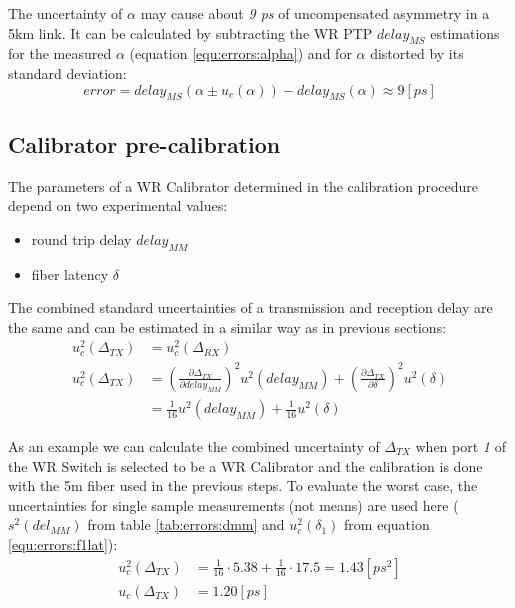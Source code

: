 The uncertainty of $\alpha$ may cause about \emph{9 ps} of uncompensated
asymmetry in a 5km link. It can be calculated by subtracting the WR PTP
$delay_{MS}$ estimations for the measured $\alpha$ (equation
\ref{equ:errors:alpha}) and for $\alpha$ distorted by its standard deviation:
\begin{equation}
	error = delay_{MS}(\alpha \pm u_c(\alpha)) - delay_{MS}(\alpha) \approx 9 [ps]
\end{equation}

\subsection{Calibrator pre-calibration}
The parameters of a WR Calibrator determined in the calibration procedure depend
on two experimental values:
\begin{itemize}
	\item round trip delay $delay_{MM}$
	\item fiber latency $\delta$
\end{itemize}

The combined standard uncertainties of a transmission and reception delay are the
same and can be estimated in a similar way as in previous sections:
\begin{align}
	u_c^2(\Delta_{TX}) &= u_c^2(\Delta_{RX}) \\
	u_c^2(\Delta_{TX}) &= \left( \frac{\partial \Delta_{TX}}{\partial delay_{MM}}
	\right)^2 u^2(delay_{MM}) + \left( \frac{\partial \Delta_{TX}}{\partial
	\delta} \right)^2 u^2(\delta) \nonumber\\
	&= \frac{1}{16} u^2(delay_{MM}) + \frac{1}{16} u^2(\delta)
\end{align}

As an example we can calculate the combined uncertainty of $\Delta_{TX}$ when
port \emph{1} of the WR Switch is selected to be a WR Calibrator and the calibration is
done with the 5m fiber used in the previous steps. To evaluate the worst case, the
uncertainties for single sample measurements (not means) are used here
($s^2(del_{MM})$ from table \ref{tab:errors:dmm} and $u^2_c(\delta_1)$ from
equation \ref{equ:errors:f1lat}):
\begin{align}
	u_c^2(\Delta_{TX}) &= \frac{1}{16} \cdot 5.38 + \frac{1}{16} \cdot 17.5  =
  1.43 [ps^2]\\
	u_c(\Delta_{TX}) &= 1.20 [ps]
\end{align}

